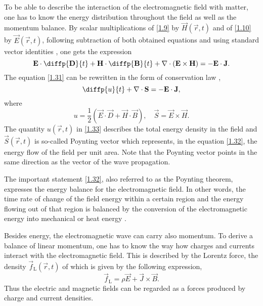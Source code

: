 To be able to describe the interaction of the electromagnetic field with matter, one has to know the energy distribution throughout the field as well as the momentum balance. By scalar multiplications of \ref{1.9} by $ \vec{H}\left( \vec{r}, t \right) $ and of \ref{1.10} by $ \vec{E}\left( \vec{r}, t \right) $, following subtraction of both obtained equations and using standard vector identities \cite{huba}, one gets the expression 
\begin{equation}
\label{1.31}
\vec{E} \cdot \diffp{\vec{D}}{t} + \vec{H} \cdot \diffp{\vec{B}}{t} + \div{\left(\vec{E} \times \vec{H} \right)} = -\vec{E} \cdot \vec{J}.
\end{equation}
The equation \ref{1.31} can be rewritten in the form of conservation law \cite{Jackson2005},
\begin{equation}
\label{1.32}
\diffp{u}{t} + \div{\vec{S}} = - \vec{E} \cdot \vec{J},
\end{equation}
where
\begin{equation}
\label{1.33}
u = \frac{1}{2} \left(\vec{E} \cdot \vec{D} + \vec{H} \cdot \vec{B} \right), \quad \vec{S} = \vec{E} \times \vec{H}.
\end{equation}
The quantity $ u\left( \vec{r}, t \right) $ in \ref{1.33} describes the total energy density in the field and $ \vec{S}\left( \vec{r}, t \right) $ is so-called Poynting vector which represents, in the equation \ref{1.32}, the energy flow of the field per unit area. Note that the Poynting vector points in the same direction as the vector of the wave propagation.

The important statement \ref{1.32}, also referred to as the Poynting theorem, expresses the energy balance for the electromagnetic field. In other words, the time rate of change of the field energy within a certain region and the energy flowing out of that region is balanced by the conversion of the electromagnetic energy into mechanical or heat energy \cite{Jackson2005}.

Besides energy, the electromagnetic wave can carry also momentum. To derive a balance of linear momentum, one has to know the way how charges and currents interact with the electromagnetic field. This is described by the Lorentz force, the density $ \vec{f}_\mathrm{L} \left( \vec{r}, t \right) $ of which is given by the following expression,
\begin{equation}
\label{1.51}
\vec{f}_\mathrm{L} = \rho \vec{E} + \vec{J} \times \vec{B}.
\end{equation}
Thus the electric and magnetic fields can be regarded as a forces produced by charge and current densities.

